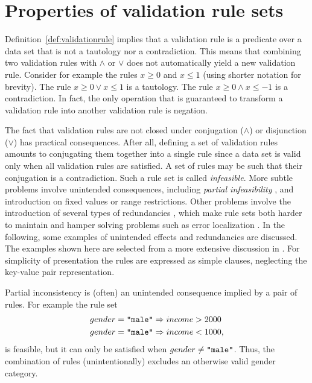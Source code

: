 \section{Properties of validation rule sets}
Definition~\ref{def:validationrule} implies that a validation rule is a
predicate over a data set that is not a tautology nor a contradiction. This
means that combining two validation rules with $\land$ or $\lor$ does not
automatically yield a new validation rule.  Consider for example the rules
$x\geq 0$ and $x \leq 1$ (using shorter notation for brevity). The rule $x \geq
0 \lor x\leq 1$ is a tautology.  The rule $x \geq 0 \land x\leq -1$ is a
contradiction. In fact, the only operation that is guaranteed to transform a
validation rule into another validation rule is negation.

The fact that validation rules are not closed under conjugation ($\land$) or
disjunction ($\lor$) has practical consequences. After all, defining a set of
validation rules amounts to conjugating them together into a single rule since
a data set is valid only when all validation rules are satisfied. A set of
rules may be such that their conjugation is a contradiction.  Such a rule set
is called \emph{infeasible}. More subtle problems involve unintended
consequences, including \emph{partial infeasibility} \citep{bruni2012formal},
and introduction on fixed values or range restrictions. Other problems involve
the introduction of several types of redundancies \citep{dillig2010small,
paulraj2010comparative}, which make rule sets both harder to maintain and
hamper solving problems such as error localization \citep{bruni2005error,
jonge2019errorlocalization}. In the following, some examples of unintended
effects and redundancies are discussed.  The examples shown here are selected
from a more extensive discussion in \citet[Chapter 8]{loo2018statistical}.  For
simplicity of presentation the rules are expressed as simple clauses,
neglecting the key-value pair representation.

Partial inconsistency is (often) an unintended consequence implied by a pair
of rules. For example the rule set
\begin{align*}
gender &= \texttt{"male"} \Rightarrow income > 2000\\
gender &= \texttt{"male"} \Rightarrow income < 1000,
\end{align*}
is feasible, but it can only be satisfied when $gender\not=\texttt{"male"}$.  Thus,
the combination of rules (unintentionally) excludes an otherwise valid gender
category. 

